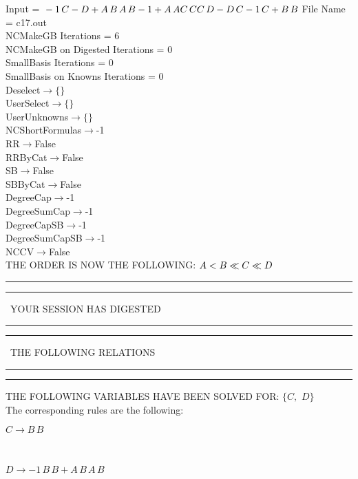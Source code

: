 \documentclass[rep10,leqno]{report}
\begin{document}
\normalsize
\baselineskip=12pt
\noindent
Input = 
$
\\-1\,
 C - D + A\,
 B\,
 A\,
 B\\
-1 + A\,
 A\\
C\,
 C\\
C\,
 D - D\,
 C\\
-1\,
 C + B\,
 B\\
$
File Name = c17.out\\
NCMakeGB Iterations = 6\\
NCMakeGB on Digested Iterations = 0\\
SmallBasis Iterations = 0\\
SmallBasis on Knowns Iterations = 0\\
Deselect$\rightarrow \{\}$\\
UserSelect$\rightarrow \{\}$\\
UserUnknowns$\rightarrow \{\}$\\
NCShortFormulas$\rightarrow$-1\\
RR$\rightarrow $False\\
RRByCat$\rightarrow $False\\
SB$\rightarrow $False\\
SBByCat$\rightarrow $False\\
DegreeCap$\rightarrow $-1\\
DegreeSumCap$\rightarrow $-1\\
DegreeCapSB$\rightarrow $-1\\
DegreeSumCapSB$\rightarrow $-1\\
NCCV$\rightarrow $False\\
THE ORDER IS NOW THE FOLLOWING:\hfil\break
$
A<B\ll
C\ll
D\\
$
\rule[2pt]{6in}{4pt}\hfil\break
\rule[2pt]{1.879in}{4pt}
\ YOUR SESSION HAS DIGESTED\ 
\rule[2pt]{1.879in}{4pt}\hfil\break
\rule[2pt]{1.923in}{4pt}
\ THE FOLLOWING RELATIONS\ 
\rule[2pt]{1.923in}{4pt}\hfil\break
\rule[2pt]{6in}{4pt}\hfil\break
THE FOLLOWING VARIABLES HAVE BEEN SOLVED FOR:\hfil\break
$\{C,
$ $
D\}$
\smallskip\\
The corresponding rules are the following:\smallskip\\
\begin{minipage}{6in}
$
C\rightarrow B\,
 B
$
\end{minipage}\medskip\\
\begin{minipage}{6in}
$
D\rightarrow -1\,
 B\,
 B + A\,
 B\,
 A\,
 B
$
\end{minipage}\medskip\\
\end{document}
